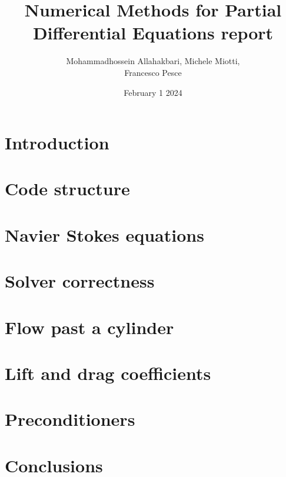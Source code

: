 \documentclass{article}
\title{Numerical Methods for Partial Differential Equations report}
\author{Mohammadhossein Allahakbari, Michele Miotti, \\Francesco Pesce}
\date{February 1 2024}
\begin{document}
\maketitle

\section{Introduction}
	

\section{Code structure}
	

\section{Navier Stokes equations}
	 

\section{Solver correctness}\label{sec:correctness}
	 

\section{Flow past a cylinder}
	 

\section{Lift and drag coefficients}
	 

\section{Preconditioners}\label{sec:preconditioners}
	 

\section{Conclusions}
    



\end{document}
